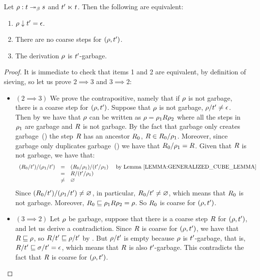 \begin{proposition}
Let $\rho : t \mathrel{\twoheadrightarrow_\beta} s$ and $t' \mathrel{\ltimes} t$.
Then the following are equivalent:
\begin{enumerate}
\item $\rho \downarrow t' = \epsilon$.
\item There are no coarse steps for $(\rho,t')$.
\item The derivation $\rho$ is $t'$-garbage.
\end{enumerate}
\end{proposition}
\begin{proof}
It is immediate to check that items 1 and 2 are equivalent, by definition of sieving,
so let us prove $2 \implies 3$ and $3 \implies 2$:
\begin{itemize}
\item $(2 \implies 3)$
  We prove the contrapositive, namely that if $\rho$ is not garbage,
  there is a coarse step for $(\rho,t')$.
  Suppose that $\rho$ is not garbage, \ie $\rho/t' \neq \epsilon$.
  Then
  by 
  we have that $\rho$ can be written as $\rho = \rho_1 R \rho_2$ where
  all the steps in $\rho_1$ are garbage and $R$ is not garbage.
  By the fact that garbage only creates garbage~()
  the step $R$ has an ancestor $R_0$, \ie $R \in R_0/\rho_1$.
  Moreover, since garbage only duplicates garbage~()
  we have that $R_0/\rho_1 = R$.
  Given that $R$ is not garbage, we have that:
  \[
    \begin{array}{rcll}
          (\redex_0/\tm')/(\redseq_1/\tm')
    & = & (\redex_0/\redseq_1)/(\tm'/\redseq_1) & \text{ by \rlem{generalized_cube_lemma}} \\
    & = & \redex/(\tm'/\redseq_1) \\
    & \neq & \emptyset \\
    \end{array}
  \]
  Since $(R_0/t')/(\rho_1/t') \neq \varnothing$, in particular,
  $R_0/t' \neq \varnothing$, which means that $R_0$ is not garbage.
  Moreover, $R_0 \sqsubseteq \rho_1R\rho_2 = \rho$.
  So $R_0$ is coarse for $(\rho,t')$.
\item $(3 \implies 2)$
  Let $\rho$ be garbage, suppose that there is a coarse step $R$ for $(\rho,t')$,
  and let us derive a contradiction.
  Since $R$ is coarse for $(\rho,t')$,
  we have that $R \sqsubseteq \rho$,
  so $R/t' \sqsubseteq \rho/t'$ by .
  But $\rho/t'$ is empty because $\rho$ is $t'$-garbage,
  that is, $R/t' \sqsubseteq \sigma/t' = \epsilon$,
  which means that $R$ is also $t'$-garbage.
  This contradicts the fact that $R$ is coarse for $(\rho,t')$.
\end{itemize}
\end{proof}

